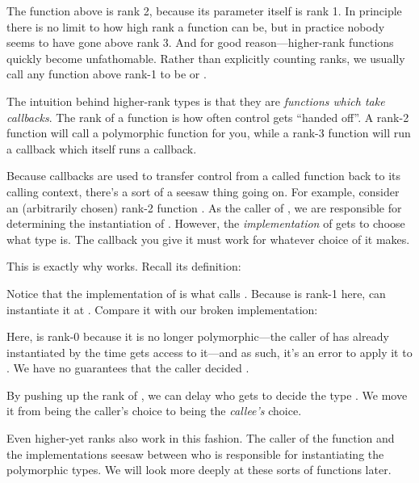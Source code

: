 \documentclass[book.tex]{subfiles}
\begin{document}
The function  above is rank 2, because its  parameter
itself is rank 1.  In principle there is no limit to how high rank a function
can be, but in practice nobody seems to have gone above rank 3. And for good
reason---higher-rank functions quickly become unfathomable. Rather than
explicitly counting ranks, we usually call any function above rank-1 to be
 or .

The intuition behind higher-rank types is that they are \emph{functions which
take callbacks}. The rank of a function is how often control gets ``handed
off''. A rank-2 function will call a polymorphic function for you, while a
rank-3 function will run a callback which itself runs a callback.

Because callbacks are used to transfer control from a called function back to
its calling context, there's a sort of a seesaw thing going on. For example,
consider an (arbitrarily chosen) rank-2 function . As the caller of , we are responsible for determining the
instantiation of . However, the \emph{implementation} of  gets to
choose what type  is. The callback you give it must work for whatever
choice of  it makes.

This is exactly why  works. Recall its definition:


Notice that the implementation of  is what calls . Because
 is rank-1 here,  can instantiate it at . Compare
it with our broken implementation:


Here,  is rank-0 because it is no longer polymorphic---the caller of
 has already instantiated  by the time 
gets access to it---and as such, it's an error to apply it to . We have no
guarantees that the caller decided .

By pushing up the rank of , we can delay who gets to decide the
type . We move it from being the caller's choice to being the
\emph{callee's} choice.

Even higher-yet ranks also work in this fashion. The caller of the function and
the implementations seesaw between who is responsible for instantiating the
polymorphic types. We will look more deeply at these sorts of functions later.
\end{document}
